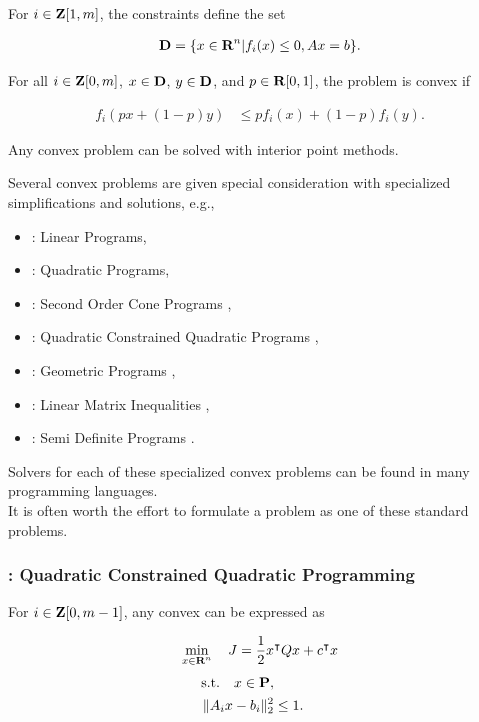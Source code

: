 \documentclass{article}
\begin{document}
For $i\in\textbf{Z}[1,m]$, the constraints define the set

\begin{align*}
    \textbf{D} = \{x\in\textbf{R}^n| f_i(x)\leq 0, Ax =b\}.
\end{align*}

For all $i\in\textbf{Z}[0,m]$, $x\in\textbf{D}$, $y\in\textbf{D}$, and $p\in\textbf{R}[0,1]$, the problem is convex if

\begin{align*}
    f_i(px+(1-p)y)&\leq p f_i(x)+(1-p)f_i(y).
\end{align*}

Any convex problem can be solved with interior point methods.

\clearpage

Several convex problems are given special consideration with specialized simplifications and solutions,
e.g.,

\begin{itemize}
    \item \LP: Linear Programs,
    \item \QP: Quadratic Programs,
    \item \SOCP: Second Order Cone Programs \cite[p.~158]{bv_cvxbook},
    \item \QCQP: Quadratic Constrained Quadratic Programs \cite[p.~152]{bv_cvxbook}\cite{sdp},
    \item \GP: Geometric Programs \cite[p.~161]{bv_cvxbook},
    \item \LMI: Linear Matrix Inequalities \cite[p.~169]{bv_cvxbook},
    \item \SDP: Semi Definite Programs \cite[p.~168]{bv_cvxbook}\cite{sdp}.
\end{itemize}

Solvers for each of these specialized convex problems can be found in many programming languages.\\
It is often worth the effort to formulate a problem as one of these standard problems.


\subsubsection{\QCQP: Quadratic Constrained Quadratic Programming}

For $i\in\textbf{Z}[0,m-1]$, any convex \QCQP can be expressed as 

\begin{align}
    \min_{x\in\textbf{R}^n}\quad J = \frac{1}{2} x^\intercal Q x + c^\intercal x
\end{align}
\begin{align*}
    \text{s.t.}\quad x\in\textbf{P},\\
    \|A_i x-b_i\|_2^2&\leq 1.
\end{align*}
\end{document}
